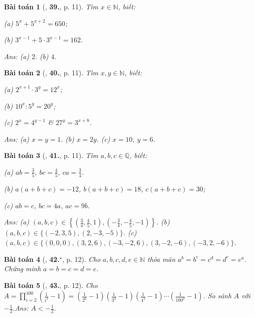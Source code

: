 \documentclass{article}
\numberwithin{equation}{section}
\newtheorem{baitoan}{Bài toán}
\begin{document}
\begin{baitoan}[\cite{Binh_Toan_7_tap_1}, \textbf{39.}, p. 11]
	Tìm $x\in\mathbb{N}$, biết:
	\begin{enumerate*}
		\item[(a)] $5^x + 5^{x+2} = 650$;
		\item[(b)] $3^{x-1} + 5\cdot 3^{x-1} = 162$.
	\end{enumerate*}\hfill\textsf{Ans:} (a) $2$. (b) $4$.
\end{baitoan}

\begin{baitoan}[\cite{Binh_Toan_7_tap_1}, \textbf{40.}, p. 11]
	Tìm $x,y\in\mathbb{N}$, biết:
	\begin{enumerate*}
		\item[(a)] $2^{x+1}\cdot 3^y = 12^x$;
		\item[(b)] $10^x:5^y = 20^y$;
		\item[(c)] $2^x = 4^{y-1}$ \& $27^y = 3^{x+8}$.
	\end{enumerate*}\hfill\textsf{Ans:} (a) $x = y = 1$. (b) $x = 2y$. (c) $x = 10$, $y = 6$.
\end{baitoan}

\begin{baitoan}[\cite{Binh_Toan_7_tap_1}, \textbf{41.}, p. 11]
	Tìm $a,b,c\in\mathbb{Q}$, biết:
	\begin{enumerate*}
		\item[(a)] $ab = \frac{3}{5}$, $bc = \frac{4}{5}$, $ca = \frac{3}{4}$.
		\item[(b)] $a(a + b + c) = -12$, $b(a + b + c) = 18$, $c(a + b + c) = 30$;
		\item[(c)] $ab = c$, $bc = 4a$, $ac = 9b$.
	\end{enumerate*}\hfill\textsf{Ans:} (a) $(a,b,c)\in\left\{\left(\frac{3}{4},\frac{4}{5},1\right),\left(-\frac{3}{4},-\frac{4}{5},-1\right)\right\}$. (b) $(a,b,c)\in\{(-2,3,5),(2,-3,-5)\}$. (c) $(a,b,c)\in\{(0,0,0),(3,2,6),(-3,-2,6),(3,-2,-6),(-3,2,-6)\}$.
\end{baitoan}

\begin{baitoan}[\cite{Binh_Toan_7_tap_1}, \textbf{42.}${}^\star$, p. 12]
	Cho $a,b,c,d,e\in\mathbb{N}$ thỏa mãn $a^b = b^c = c^d = d^e = e^a$. Chứng minh $a = b = c = d = e$.
\end{baitoan}

\begin{baitoan}[\cite{Binh_Toan_7_tap_1}, \textbf{43.}, p. 12]
	Cho $A = \prod_{i=2}^{100} \left(\frac{1}{i^2} - 1\right) = \left(\frac{1}{2^2} - 1\right)\left(\frac{1}{3^2} - 1\right)\left(\frac{1}{4^2} - 1\right)\cdots\left(\frac{1}{100^2} - 1\right)$. So sánh $A$ với $-\frac{1}{2}$.\hfill\textsf{Ans:} $A < -\frac{1}{2}$.
\end{baitoan}
\end{document}
